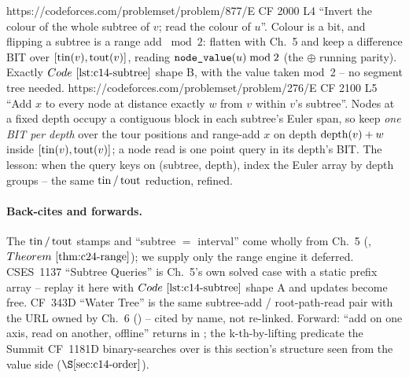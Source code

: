 \begin{practiceset}
    {https://codeforces.com/problemset/problem/877/E}
    {CF 2000 L4}
    {``Invert the colour of the whole subtree of \(v\); read the colour of
     \(u\)''.  Colour is a bit, and flipping a subtree is a range add
     \(\bmod 2\): flatten with Ch.~5 and keep a difference BIT over
     \([\operatorname{tin}(v),\operatorname{tout}(v)]\), reading \(\texttt{node\_value}(u)\bmod 2\) (the
     \(\oplus\) running parity).  Exactly \(\coderef{c14-subtree}\) shape B,
     with the value taken mod~2 -- no segment tree needed.}
    {https://codeforces.com/problemset/problem/276/E}
    {CF 2100 L5}
    {``Add \(x\) to every node at distance exactly \(w\) from \(v\) within
     \(v\)'s subtree''.  Nodes at a fixed depth occupy a contiguous block in
     each subtree's Euler span, so keep \emph{one BIT per depth} over the tour
     positions and range-add \(x\) on depth \(\operatorname{depth}(v)+w\) inside
     \([\operatorname{tin}(v),\operatorname{tout}(v)]\); a node read is one point query in its depth's BIT.
     The lesson: when the query keys on (subtree, depth), index the Euler
     array by depth groups -- the same \(\operatorname{tin}/\operatorname{tout}\) reduction, refined.}
\end{practiceset}

\paragraph{Back-cites and forwards.}
The \(\operatorname{tin}/\operatorname{tout}\) stamps and ``subtree \(=\) interval'' come wholly from
Ch.~5 (, \(\thmref{c24-range}\)); we supply only the range engine it
deferred.  CSES~1137 ``Subtree Queries'' is Ch.~5's own solved case with a
static prefix array -- replay it here with \(\coderef{c14-subtree}\) shape A and
updates become free.  CF~343D ``Water Tree'' is the same subtree-add /
root-path-read pair with the URL owned by Ch.~6 () -- cited by name,
not re-linked.  Forward: ``add on one axis, read on another, offline'' returns
in ; the k-th-by-lifting predicate the Summit CF~1181D
binary-searches over is this section's structure seen from the value side
(\(\secref{c14-order}\)).

